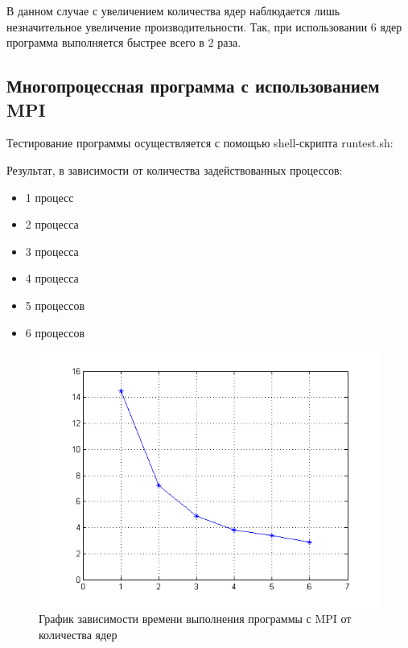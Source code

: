 В данном случае с увеличением количества ядер наблюдается лишь незначительное увеличение производительности. Так, при использовании 6 ядер программа выполняется быстрее всего в 2 раза.

\subsection{Многопроцессная программа с использованием MPI}

Тестирование программы осуществляется с помощью shell-скрипта runtest.sh:



Результат, в зависимости от количества задействованных процессов:

\begin{itemize}
	\item 1 процесс
		
	\item 2 процесса
		
	\item 3 процесса
		
	\item 4 процесса
		
	\item 5 процессов
		
	\item 6 процессов
		
\end{itemize}

\begin{figure}[H]
	\begin{center}
		\includegraphics[scale=0.7]{pic/mpi.png}
		\caption{График зависимости времени выполнения программы с MPI от количества ядер} 
		\label{pic:pic_name} %
	\end{center}
\end{figure}

